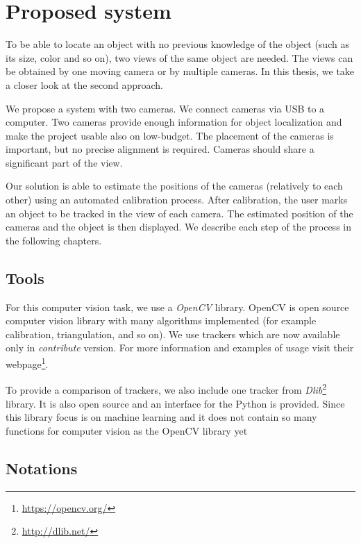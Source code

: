 \chapter{Proposed system}

To be able to locate an object with no previous knowledge of the object (such
as its size, color and so on), two views of the same object are needed. The
views can be obtained by one moving camera or by multiple cameras. In this
thesis, we take a closer look at the second approach.

We propose a system with two cameras. We connect cameras via USB to a computer.
Two cameras provide enough information for object localization and make the
project usable also on low-budget. The placement of the cameras is important,
but no precise alignment is required. Cameras should share a significant part
of the view.


Our solution is able to estimate the positions of the cameras (relatively to
each other) using an automated calibration process. After calibration, the user
marks an object to be tracked in the view of each camera. The estimated
position of the cameras and the object is then displayed. We describe each step
of the process in the following chapters.

\section{Tools}

For this computer vision task, we use a \emph{OpenCV} library. OpenCV is open
source computer vision library with many algorithms implemented (for example
calibration, triangulation, and so on). We use trackers which are now available
only in \emph{contribute} version. For more information and examples of usage
visit their webpage\footnote{\url{https://opencv.org/}}.

To provide a comparison of trackers, we also include one tracker from
\emph{Dlib}\footnote{\url{http://dlib.net/}} library. It is also open source
and an interface for the Python is provided.  Since this library focus is on
machine learning and it does not contain so many functions for computer vision
as the OpenCV library yet

\section{Notations}

